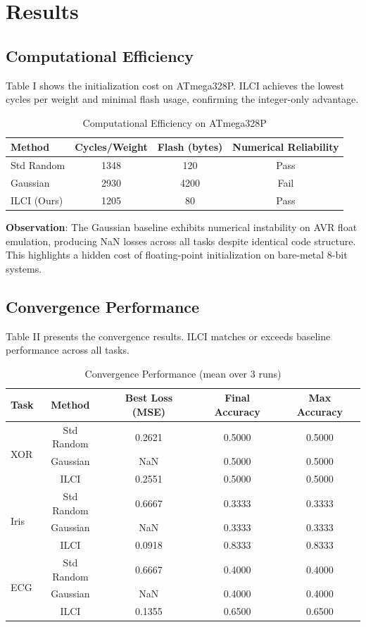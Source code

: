 \documentclass[conference]{IEEEtran}
\begin{document}
\section{Results}

\subsection{Computational Efficiency}
Table I shows the initialization cost on ATmega328P. ILCI achieves the lowest cycles per weight and minimal flash usage, confirming the integer-only advantage.

\begin{table}[ht]
\centering
\caption{Computational Efficiency on ATmega328P}
\label{tab:efficiency}
\begin{tabular}{lccc}
\hline
Method & Cycles/Weight & Flash (bytes) & Numerical Reliability \\
\hline
Std Random & 1348 & 120 & Pass \\
Gaussian & 2930 & 4200 & Fail \\
ILCI (Ours) & 1205 & 80 & Pass \\
\hline
\end{tabular}
\end{table}

\textbf{Observation}: The Gaussian baseline exhibits numerical instability on AVR float emulation, producing NaN losses across all tasks despite identical code structure. This highlights a hidden cost of floating-point initialization on bare-metal 8-bit systems.

\subsection{Convergence Performance}
Table II presents the convergence results. ILCI matches or exceeds baseline performance across all tasks.

\begin{table}[ht]
\centering
\caption{Convergence Performance (mean over 3 runs)}
\label{tab:convergence}
\begin{tabular}{lcccc}
\hline
Task & Method & Best Loss (MSE) & Final Accuracy & Max Accuracy \\
\hline
\multirow{3}{*}{XOR}
& Std Random & 0.2621 & 0.5000 & 0.5000 \\
& Gaussian & NaN & 0.5000 & 0.5000 \\
& ILCI & 0.2551 & 0.5000 & 0.5000 \\
\hline
\multirow{3}{*}{Iris}
& Std Random & 0.6667 & 0.3333 & 0.3333 \\
& Gaussian & NaN & 0.3333 & 0.3333 \\
& ILCI & 0.0918 & 0.8333 & 0.8333 \\
\hline
\multirow{3}{*}{ECG}
& Std Random & 0.6667 & 0.4000 & 0.4000 \\
& Gaussian & NaN & 0.4000 & 0.4000 \\
& ILCI & 0.1355 & 0.6500 & 0.6500 \\
\hline
\end{tabular}
\end{table}
\end{document}
